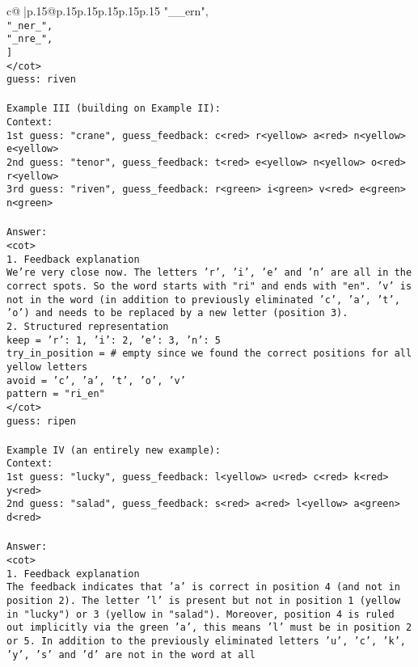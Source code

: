 \documentclass{article}
\begin{document}
{\begin{supertabular}{c@{$\;$}|p{.15\linewidth}@{}p{.15\linewidth}p{.15\linewidth}p{.15\linewidth}p{.15\linewidth}p{.15\linewidth}}
{{{  "__ern",\\ \tt     "_ner_",\\ \tt     "_nre_",\\ \tt ]\\ \tt </cot>\\ \tt guess: riven\\ \tt \\ \tt Example III (building on Example II):\\ \tt Context:\\ \tt 1st guess: "crane", guess_feedback: c<red> r<yellow> a<red> n<yellow> e<yellow>\\ \tt 2nd guess: "tenor", guess_feedback: t<red> e<yellow> n<yellow> o<red> r<yellow>\\ \tt 3rd guess: "riven", guess_feedback: r<green> i<green> v<red> e<green> n<green>\\ \tt \\ \tt Answer:\\ \tt <cot>\\ \tt 1. Feedback explanation\\ \tt We're very close now. The letters 'r', 'i', 'e' and 'n' are all in the correct spots. So the word starts with "ri" and ends with "en". 'v' is not in the word (in addition to previously eliminated 'c', 'a', 't', 'o') and needs to be replaced by a new letter (position 3).\\ \tt 2. Structured representation\\ \tt keep = {'r': 1, 'i': 2, 'e': 3, 'n': 5}\\ \tt try_in_position = {}  # empty since we found the correct positions for all yellow letters\\ \tt avoid = {'c', 'a', 't', 'o', 'v'}\\ \tt pattern = "ri_en"\\ \tt </cot>\\ \tt guess: ripen\\ \tt \\ \tt Example IV (an entirely new example):\\ \tt Context:\\ \tt 1st guess: "lucky", guess_feedback: l<yellow> u<red> c<red> k<red> y<red>\\ \tt 2nd guess: "salad", guess_feedback: s<red> a<red> l<yellow> a<green> d<red>\\ \tt \\ \tt Answer:\\ \tt <cot>\\ \tt 1. Feedback explanation\\ \tt The feedback indicates that 'a' is correct in position 4 (and not in position 2). The letter 'l' is present but not in position 1 (yellow in "lucky") or 3 (yellow in "salad"). Moreover, position 4 is ruled out implicitly via the green 'a', this means 'l' must be in position 2 or 5. In addition to the previously eliminated letters {'u', 'c', 'k', 'y'}, 's' and 'd' are not in the word at all }}}
\end{supertabular}}
\end{document}
